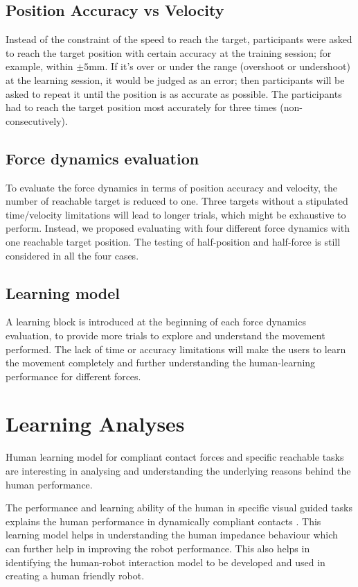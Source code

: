 \subsection{Position Accuracy vs Velocity} 
Instead of the constraint of the speed to reach the target, participants were asked to reach the target position with certain accuracy at the training session; for example, within $\pm 5$mm. If it’s over or under the range (overshoot or undershoot) at the learning session, it would be judged as an error; then participants will be asked to repeat it until the position is as accurate as possible. The participants had to reach the target position most accurately for three times (non-consecutively).

\subsection{Force dynamics evaluation}
To evaluate the force dynamics in terms of position accuracy and velocity, the number of reachable target is reduced to one. Three targets without a stipulated time/velocity limitations will lead to longer trials, which might be exhaustive to perform.  Instead, we proposed evaluating with four different force dynamics with one reachable target position. The testing of half-position and half-force is still considered in all the four cases.

\subsection{Learning model}
A learning block is introduced at the beginning of each force dynamics evaluation, to provide more trials to explore and understand the movement performed. The lack of time or accuracy limitations will make the users to learn the movement completely and further understanding the human-learning performance for different forces.

\section{Learning Analyses}
Human learning model for compliant contact forces and specific reachable tasks are interesting in analysing and understanding the underlying reasons behind the human performance. 

The performance and learning ability of the human in specific visual guided tasks explains the human performance in dynamically compliant contacts \cite{ernst2002}. This learning model helps in understanding the human impedance behaviour which can further help in improving the robot performance. This also helps in identifying the human-robot interaction model to be developed and used in creating a human friendly robot. 

